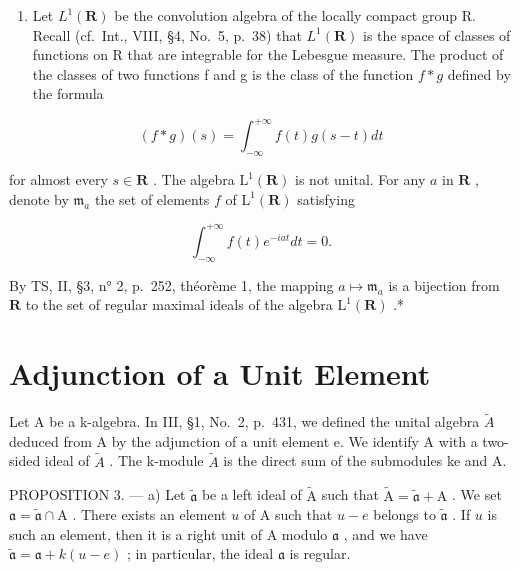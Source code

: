 \begin{enumerate}
\def\labelenumi{\arabic{enumi})}
\setcounter{enumi}{2}
\tightlist
\item
  Let \(L^{1}(\mathbf{R})\) be the convolution algebra of the locally compact group R. Recall (cf.~Int., VIII, §4, No.~5, p.~38) that \(L^{1}(\mathbf{R})\) is the space of classes of functions on R that are integrable for the Lebesgue measure. The product of the classes of two functions f and g is the class of the function \(f * g\) defined by the formula
\end{enumerate}

\[
(f * g) (s) = \int_ {- \infty} ^ {+ \infty} f (t) g (s - t) d t
\]

for almost every \(s \in \mathbf{R}\) . The algebra \(\mathrm{L}^1(\mathbf{R})\) is not unital. For any \(a\) in \(\mathbf{R}\) , denote by \(\mathfrak{m}_a\) the set of elements \(f\) of \(\mathrm{L}^1(\mathbf{R})\) satisfying

\[
\int_ {- \infty} ^ {+ \infty} f (t) e ^ {- i a t} d t = 0.
\]

By TS, II, §3, n° 2, p.~252, théorème 1, the mapping \(a \mapsto \mathfrak{m}_a\) is a bijection from \(\mathbf{R}\) to the set of regular maximal ideals of the algebra \(\mathrm{L}^1(\mathbf{R})\) .*

\section{Adjunction of a Unit Element}

Let A be a k-algebra. In III, §1, No.~2, p.~431, we defined the unital algebra \(\widetilde{A}\) deduced from A by the adjunction of a unit element e. We identify A with a two-sided ideal of \(\widetilde{A}\) . The k-module \(\widetilde{A}\) is the direct sum of the submodules ke and A.

PROPOSITION 3. --- a) Let \(\widetilde{\mathfrak{a}}\) be a left ideal of \(\widetilde{\mathrm{A}}\) such that \(\widetilde{\mathrm{A}} = \widetilde{\mathfrak{a}} + \mathrm{A}\) . We set \(\mathfrak{a} = \widetilde{\mathfrak{a}} \cap \mathrm{A}\) . There exists an element \(u\) of \(\mathrm{A}\) such that \(u - e\) belongs to \(\widetilde{\mathfrak{a}}\) . If \(u\) is such an element, then it is a right unit of \(\mathrm{A}\) modulo \(\mathfrak{a}\) , and we have \(\widetilde{\mathfrak{a}} = \mathfrak{a} + k(u - e)\) ; in particular, the ideal \(\mathfrak{a}\) is regular.

